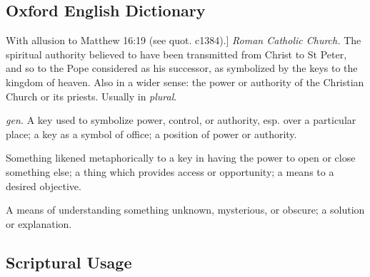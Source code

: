 \subsection{Oxford English Dictionary} %
	\label{KEY-OED}

	\begin{compactitem}
		\item[II.3.a] With allusion to Matthew 16:19 (see quot. c1384).] \textit{Roman Catholic Church.} The spiritual authority believed to have been transmitted from Christ to St Peter, and so to the Pope considered as his successor, as symbolized by the keys to the kingdom of heaven. Also in a wider sense: the power or authority of the Christian Church or its priests. Usually in \textit{plural}.
		\item[II.3.b] \textit{gen.} A key used to symbolize power, control, or authority, esp. over a particular place; a key as a symbol of office; a position of power or authority.
		\item[II.4.a] Something likened metaphorically to a key in having the power to open or close something else; a thing which provides access or opportunity; a means to a desired objective.
		\item[II.5.a] A means of understanding something unknown, mysterious, or obscure; a solution or explanation.
	\end{compactitem}

\subsection{Scriptural Usage} %
	\label{KEY-SCRIPTURES}

	
	
			
			
